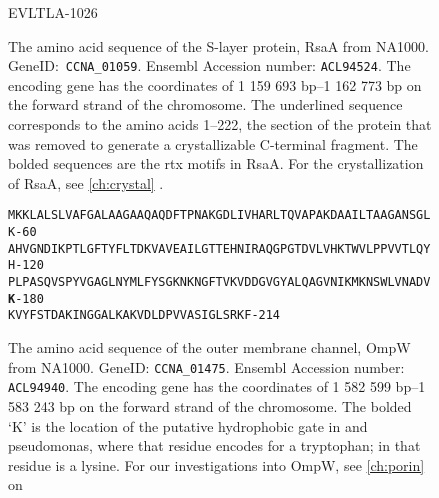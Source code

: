 \begin{figure}[htb]
\begin{center}
{EVLTLA\hfill-1026\\
  }
   	\end{center}
   	\caption[RsaA, amino acid sequence]{
   The amino acid sequence of the \ac{S-layer} protein, RsaA from \caulobacter{} NA1000. GeneID:~\texttt{CCNA\_01059}. Ensembl Accession number: \texttt{ACL94524}. The encoding gene has the coordinates of 1 159 693 bp--1 162 773 bp on the forward strand of the \caulobacter chromosome. The underlined sequence corresponds to the amino acids 1--222, the section of the protein that was removed to generate a crystallizable C-terminal fragment. The bolded sequences are the \ac{rtx} motifs in RsaA. For the crystallization of RsaA, see \cref{ch:crystal} .}
   	
\end{figure}   
\begin{figure}[htb]
  	\begin{center}
\label{app:ompwseq}
\texttt{\singlespacing\small  MKKLALSLVAFGALAAGAAQAQDFTPNAKGDLIVHARLTQVAPAKDAAILTAAGANSGLK\hfill-60~\\
AHVGNDIKPTLGFTYFLTDKVAVEAILGTTEHNIRAQGPGTDVLVHKTWVLPPVVTLQYH\hfill-120\\
PLPASQVSPYVGAGLNYMLFYSGKNKNGFTVKVDDGVGYALQAGVNIKMKNSWLVNADV\textbf{K}\hfill-180\\
KVYFSTDAKINGGALKAKVDLDPVVASIGLSRKF\hfill-214\\
  }
   	\end{center}
   	\caption[OmpW, amino acid sequence]{
   The amino acid sequence of the outer membrane channel, OmpW from \caulobacter NA1000. GeneID: \texttt{CCNA\_01475}. Ensembl Accession number: \texttt{ACL94940}. The encoding gene has the coordinates of 1 582 599 bp--1 583 243 bp on the forward strand of the \caulobacter chromosome. The bolded `K' is the location of the putative hydrophobic gate in \ecoli and \ac{pseudomonas}, where that residue encodes for a tryptophan; in \caulobacter that residue is a lysine. For our investigations into OmpW, see \cref{ch:porin} on }
\end{figure}   
